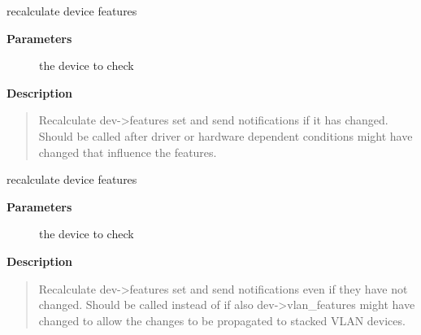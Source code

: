 \documentclass[a4paper,8pt,english]{sphinxmanual}
\begin{document}
\begin{fulllineitems}
\label{networking/kapi:c.netdev_update_features}
recalculate device features

\end{fulllineitems}


\textbf{Parameters}
\begin{description}
\item[{}] \leavevmode
the device to check

\end{description}

\textbf{Description}
\begin{quote}

Recalculate dev-\textgreater{}features set and send notifications if it
has changed. Should be called after driver or hardware dependent
conditions might have changed that influence the features.
\end{quote}

\begin{fulllineitems}
\label{networking/kapi:c.netdev_change_features}
recalculate device features

\end{fulllineitems}


\textbf{Parameters}
\begin{description}
\item[{}] \leavevmode
the device to check

\end{description}

\textbf{Description}
\begin{quote}

Recalculate dev-\textgreater{}features set and send notifications even
if they have not changed. Should be called instead of
{\hyperref[networking/kapi:c.netdev_update_features]{\emph{}}} if also dev-\textgreater{}vlan\_features might
have changed to allow the changes to be propagated to stacked
VLAN devices.
\end{quote}
\end{document}
